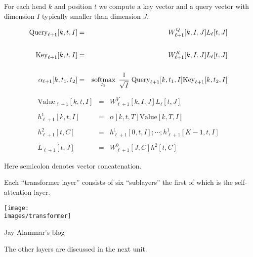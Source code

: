 {

For each head $k$ and position $t$ we compute a key vector and a query vector with dimension $I$ typically smaller than dimension $J$.

\begin{eqnarray*}
\mathrm{Query}_{\ell+1}[k,t,I] & = & W^Q_{\ell+1}[k,I,J]L_\ell[t,J] \\
\\
\mathrm{Key}_{\ell+1}[k,t,I] & = &  W^K_{\ell+1}[k,I,J]L_\ell[t,J] \\
\\
\alpha_{\ell+1}[k,t_1,t_2] & = & \operatorname*{softmax}_{t_2}\; \frac{1}{\sqrt{I}}\;\mathrm{Query}_{\ell+1}[k,t_1,I]\mathrm{Key}_{\ell+1}[k,t_2,I]
\end{eqnarray*}

      
\begin{eqnarray*}
\mathrm{Value}_{\ell+1}[k,t,I] & = & W^V_{\ell+1}[k,I,J]L_\ell[t,J] \\
\\
h^1_{\ell+1}[k,t,I] & = & \alpha[k,t,T]\mathrm{Value}[k,T,I] \\
\\
h^2_{\ell+1}[t,C] & = & h^1_{\ell+1}[0,t,I];\cdots;h^1_{\ell+1}[K-1,t,I] \\
\\
L_{\ell+1}[t,J] & = & W^0_{\ell+1}[J,C]h^2[t,C]
\end{eqnarray*}

\vfill
Here semicolon denotes vector concatenation.


Each ``transformer layer'' consists of six ``sublayers'' the first of which is the self-attention layer.


\centerline{\texttt{[image: \\images/transformer]}}

{\Large
\centerline{Jay Alammar's blog}
}

The other layers are discussed in the next unit.


}

